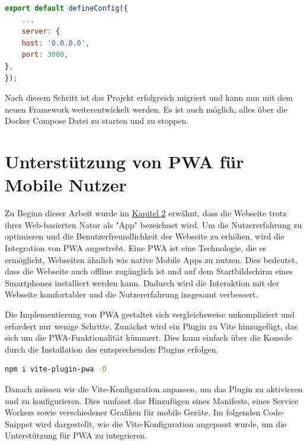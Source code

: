 \begin{lstlisting}[language={JavaScript}, caption={Port Konfiguration für das Vue Projekt}]
export default defineConfig({
    ...
    server: {
    host: '0.0.0.0',
    port: 3000,
},
});
\end{lstlisting}

Nach diesem Schritt ist das Projekt erfolgreich migriert und kann nun mit dem neuen Framework weiterentwickelt werden. Es ist auch möglich, alles über die Docker Compose Datei zu starten und zu stoppen.

\section{Unterstützung von PWA für Mobile Nutzer}

Zu Beginn dieser Arbeit wurde im \hyperref[chapter:2]{Kapitel 2} erwähnt, dass die Webseite trotz ihrer Web-basierten Natur als "App" bezeichnet wird. Um die Nutzererfahrung zu optimieren und die Benutzerfreundlichkeit der Webseite zu erhöhen, wird die Integration von \acf{PWA} angestrebt. Eine \acs{PWA} ist eine Technologie, die es ermöglicht, Webseiten ähnlich wie native Mobile Apps zu nutzen. Dies bedeutet, dass die Webseite auch offline zugänglich ist und auf dem Startbildschirm eines Smartphones installiert werden kann. Dadurch wird die Interaktion mit der Webseite komfortabler und die Nutzererfahrung insgesamt verbessert. \cite{ms-pwa}

Die Implementierung von \acs{PWA} gestaltet sich vergleichsweise unkompliziert und erfordert nur wenige Schritte. Zunächst wird ein Plugin zu Vite hinzugefügt, das sich um die \acs{PWA}-Funktionalität kümmert. Dies kann einfach über die Konsole durch die Installation des entsprechenden Plugins erfolgen.

\begin{lstlisting}[language={bash}, caption={Installation des PWA Plugins}]
npm i vite-plugin-pwa -D 
\end{lstlisting}

Danach müssen wir die Vite-Konfiguration anpassen, um das Plugin zu aktivieren und zu konfigurieren. Dies umfasst das Hinzufügen eines Manifests, eines Service Workers sowie verschiedener Grafiken für mobile Geräte. Im folgenden Code-Snippet wird dargestellt, wie die Vite-Konfiguration angepasst wurde, um die Unterstützung für \acs{PWA} zu integrieren.

